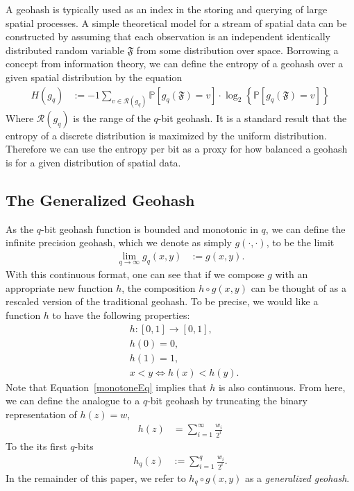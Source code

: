 \documentclass[nips13submit_09,times,art10]{article} %
\begin{document}
A geohash is typically used as an index in the storing and querying of large
spatial processes. A simple theoretical model for a stream of spatial data can
be constructed by assuming that each observation is an independent identically
distributed random variable $\mathfrak{F}$ from some distribution over space.
Borrowing a concept from information theory, we can define the entropy of a geohash
over a given spatial distribution by the equation
\begin{align}
H(g_q) &:= -1 \sum_{v \in \mathcal{R}(g_q)} \mathbb{P} \left[ g_q(\mathfrak{F}) = v\right] \cdot
            \log_2 \left\{ \mathbb{P} \left[ g_q(\mathfrak{F}) = v\right] \right\} \label{entropyDef}
\end{align}
Where $\mathcal{R}(g_q)$ is the range of the $q$-bit geohash. It is a standard result
that the entropy of a discrete distribution is maximized by the uniform distribution.
Therefore we can use the entropy per bit as a proxy for how balanced a geohash is
for a given distribution of spatial data.

\subsection{The Generalized Geohash}

As the $q$-bit geohash function is bounded and monotonic in $q$, we can define the infinite
precision geohash, which we denote as simply $g(\cdot, \cdot)$, to be the limit
\begin{align}
\lim_{q \rightarrow \infty} g_q(x,y) &:= g(x,y).
\end{align}
With this continuous format, one can see that if we compose $g$ with an appropriate new function
$h$, the composition $h \circ g(x,y)$ can be thought of as a rescaled version of the
traditional geohash. To be precise, we would like a function $h$ to have the following properties:
\begin{align}
&h: [0,1] \rightarrow [0,1], \label{hDef} \\
&h(0) = 0, \\
&h(1) = 1, \\
&x < y \iff h(x) < h(y). \label{monotoneEq}
\end{align}
Note that Equation~\ref{monotoneEq} implies that $h$ is also continuous. From here, we can define
the analogue to a $q$-bit geohash by truncating the binary representation of $h(z) = w$,
\begin{align}
h(z) &= \sum_{i=1}^{\infty} \frac{w_i}{2^i}
\end{align}
To the its first $q$-bits
\begin{align}
h_q(z) &:= \sum_{i=1}^{q} \frac{w_i}{2^i}.
\end{align}
In the remainder of this paper, we refer to $h_q \circ g(x,y)$ as a {\it generalized geohash}.
\end{document}
